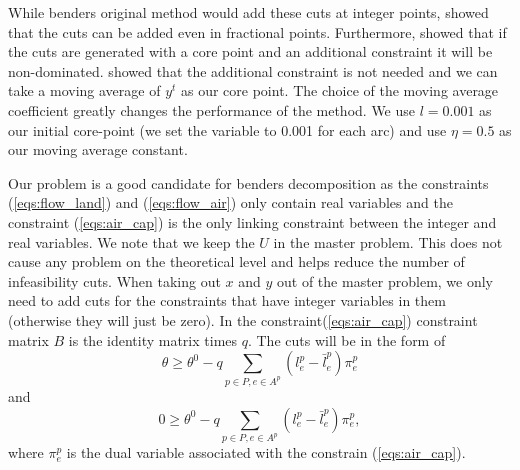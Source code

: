 \documentclass{article}
\begin{document}
	While benders original method would add these cuts at integer points, \cite{mcdanielModifiedBendersPartitioning1977} showed that the cuts can be added even in fractional points. Furthermore, \cite{magnantiAcceleratingBendersDecomposition1981} showed that if the cuts are generated with a core point and an additional constraint it will be non-dominated. \cite{papadakosPracticalEnhancementsMagnanti2008} showed that the additional constraint is not needed and we can take a moving average of $y^t$ as our core point. The choice of the moving average coefficient greatly changes the performance of the method. We use $l=0.001$ as our initial core-point (we set the variable to 0.001 for each arc) and use $\eta=0.5$ as our moving average constant.
	
	Our problem is a good candidate for benders decomposition as the constraints (\ref{eqs:flow_land}) and (\ref{eqs:flow_air}) only contain real variables and the constraint (\ref{eqs:air_cap}) is the only linking constraint between the integer and real variables. We note that we keep the $U$ in the master problem. This does not cause any problem on the theoretical level and helps reduce the number of infeasibility cuts. 
    When taking out $x$ and $y$ out of the master problem, we only need to add cuts for the constraints that have integer variables in them (otherwise they will just be zero). In the constraint(\ref{eqs:air_cap}) constraint matrix $B$ is the identity matrix times $q$. The cuts will be in the form of 
	\begin{equation}
		\theta \geq \theta^0  - q\sum_{p \in P, e \in A^p} (l^p_e - \bar{l}^p_e) \pi^p_e
	\end{equation}
	and
	\begin{equation}
		0 \geq \theta^0 - q\sum_{p \in P, e \in A^p} (l^p_e - \bar{l}^p_e)  \pi^p_e,
	\end{equation}
	where $ \pi^p_e$ is the dual variable associated with the constrain (\ref{eqs:air_cap}).
	
\end{document}
